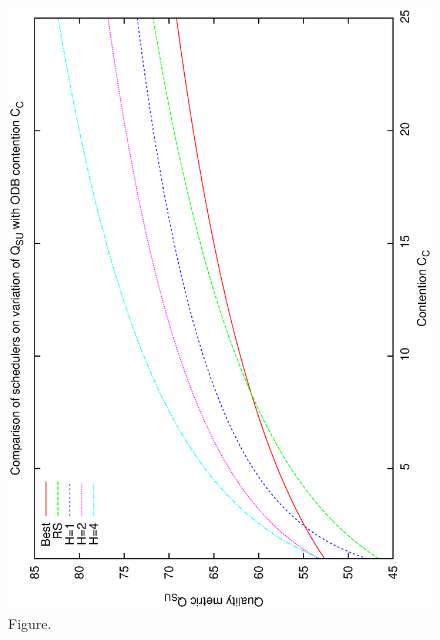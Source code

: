 \documentclass[12pt,a4paper]{article}
\begin{document}
\clearpage
\begin{figure}[htbp]
 \begin{center}
  \includegraphics[scale=1.0, angle=0]{figures/qsucc_allfit.eps}
 \end{center}
  \caption[Figure.]
{Figure.}
\end{figure}
\clearpage
\end{document}
